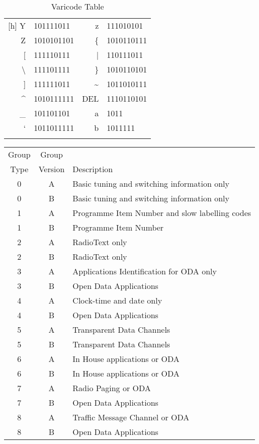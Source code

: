 \begin{longtable}{ r l || r l }[h]
	Y   & 101111011 				&	z   & 111010101  \\
	Z   & 1010101101 				&	\{   & 1010110111  \\
	{[}   & 111110111 				&	|   & 110111011  \\
	\textbackslash  & 111101111 	& 	\}   & 1010110101  \\
	{]}   & 111111011 				&	\textasciitilde   & 1011010111  \\
	\textasciicircum   & 1010111111 &	DEL & 1110110101\\
	\_   & 101101101 				&	a   & 1011  \\
	`   & 1011011111 				&	b   & 1011111  \\\hline
	\caption{Varicode Table}
	\label{tab:psk31_varicode}
\end{longtable}

\begin{table}[h]
	\begin{center}
		\begin{tabular}{ c c l }
		 Group & Group & \\
		 Type & Version & Description \\\hline
		 0 & A & Basic tuning and switching information only \\
		 0 & B & Basic tuning and switching information only \\
		 1 & A & Programme Item Number and slow labelling codes\\
		 1 & B & Programme Item Number \\
		 2 & A & RadioText only \\
		 2 & B & RadioText only \\
		 3 & A & Applications Identification for ODA only \\
		 3 & B & Open Data Applications\\
		 4 & A & Clock-time and date only \\
		 4 & B & Open Data Applications\\
		 5 & A & Transparent Data Channels \\
		 5 & B & Transparent Data Channels \\
		 6 & A & In House applications or ODA \\
		 6 & B & In House applications or ODA \\
		 7 & A & Radio Paging or ODA \\
		 7 & B & Open Data Applications\\
		 8 & A & Traffic Message Channel or ODA \\
		 8 & B & Open Data Applications\\

\end{tabular}
\end{center}
\end{table}
